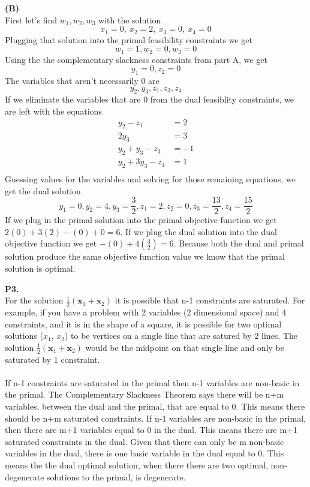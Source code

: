 \documentclass[11pt]{article}
\newcommand\vx {\mathbf{x}}
\begin{document}
\noindent\textbf{(B)}
\\
First let's find $w_1, w_2, w_3$ with the solution 
\[ x_1 = 0,\ x_2 = 2,\ x_3 = 0,\ x_4 = 0 \]
Plugging that solution into the primal feasibility constraints we get
\[w_1 = 1, w_2 = 0, w_3 = 0\]
Using the the complementary slackness constraints from part A, we get
\[y_1 = 0, z_2 = 0\]
The variables that aren't necessarily 0 are
\[y_2, y_3, z_1, z_3, z_4\]
If we eliminate the variables that are 0 from the dual feasiblity constraints, we are left with the equations
\begin{align*}
y_2 - z_1 &= 2 \\
2y_3 &= 3 \\
y_2 + y_3 - z_3 &= -1 \\
y_2 + 3y_3 - z_4 &= 1 \\
\end{align*}
Guessing values for the variables and solving for those remaining equations, we get the dual solution
\[y_1 = 0, y_2 = 4, y_3 = \frac{3}{2}, z_1 = 2, z_2 = 0, z_3 = \frac{13}{2}, z_4 = \frac{15}{2}\]
If we plug in the primal solution into the primal objective function we get 
$2(0) + 3(2) - (0) + 0 = 6$.  If we plug the dual solution into the dual objective function we get $-(0) + 4(\frac{3}{2}) = 6$.  Because both the dual and primal solution produce the same objective function value we know that the primal solution is optimal.

\bigskip

\noindent\textbf{P3.}
\\
For the solution $\frac{1}{2} (\vx_1 + \vx_2)$ it is possible that n-1 constraints are saturated.  For example, if you have a problem with 2 variables (2 dimensional space) and 4 constraints, and it is in the shape of a square, it is possible for two optimal solutions ($x_1$, $x_2$) to be vertices on a single line that are satured by 2 lines.  The solution $\frac{1}{2} (\vx_1 + \vx_2)$ would be the midpoint on that single line and only be saturated by 1 constraint.\\
\\
If n-1 constraints are saturated in the primal then n-1 variables are non-basic in the primal.  The Complementary Slackness Theorem says there will be n+m variables, between the dual and the primal, that are equal to 0.  This means there should be n+m saturated constraints.  If n-1 variables are non-basic in the primal, then there are m+1 variables equal to 0 in the dual.  This means there are m+1 saturated constraints in the dual.  Given that there can only be m non-basic variables in the dual, there is one basic variable in the dual equal to 0.  This means the the dual optimal solution, when there there are two optimal, non-degenerate solutions to the primal, is degenerate.   
\end{document}

